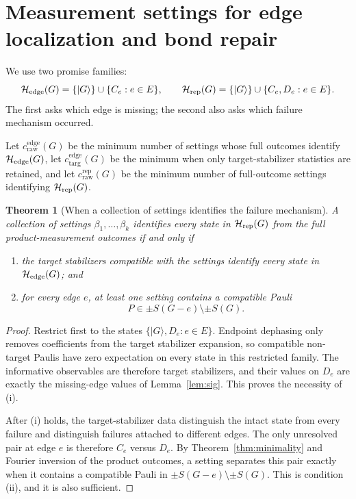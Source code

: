 \documentclass[11pt]{article}
\newtheorem{theorem}{Theorem}[section]
\theoremstyle{remark}
\newcommand{\cdiag}{c_{\mathrm{targ}}^{\mathrm{edge}}}
\newcommand{\ccutraw}{c_{\mathrm{raw}}^{\mathrm{edge}}}
\newcommand{\crep}{c_{\mathrm{raw}}^{\mathrm{rep}}}
\begin{document}
\section{Measurement settings for edge localization and bond repair}\label{sec:resources}

We use two promise families:
\[
\mathcal H_{\rm edge}(G)=\{|G\rangle\}\cup\{C_e:e\in E\},
\qquad
\mathcal H_{\rm rep}(G)=\{|G\rangle\}\cup\{C_e,D_e:e\in E\}.
\]
The first asks which edge is missing; the second also asks which failure mechanism occurred.

Let \(\ccutraw(G)\) be the minimum number of settings whose full outcomes identify \(\mathcal H_{\rm edge}(G)\), let \(\cdiag(G)\) be the minimum when only target-stabilizer statistics are retained, and let \(\crep(G)\) be the minimum number of full-outcome settings identifying \(\mathcal H_{\rm rep}(G)\).

\begin{theorem}[When a collection of settings identifies the failure mechanism]\label{thm:repdecomp}
A collection of settings \(\beta_1,\ldots,\beta_k\) identifies every state in \(\mathcal H_{\rm rep}(G)\) from the full product-measurement outcomes if and only if
\begin{enumerate}[label=(\roman*)]
\item the target stabilizers compatible with the settings identify every state in \(\mathcal H_{\rm edge}(G)\); and
\item for every edge \(e\), at least one setting contains a compatible Pauli
\[
P\in \pm S(G-e)\setminus\pm S(G).
\]
\end{enumerate}
\end{theorem}

\begin{proof}
Restrict first to the states \(\{|G\rangle,D_e:e\in E\}\).  Endpoint dephasing only removes coefficients from the target stabilizer expansion, so compatible non-target Paulis have zero expectation on every state in this restricted family.  The informative observables are therefore target stabilizers, and their values on \(D_e\) are exactly the missing-edge values of Lemma~\ref{lem:sig}.  This proves the necessity of (i).

After (i) holds, the target-stabilizer data distinguish the intact state from every failure and distinguish failures attached to different edges.  The only unresolved pair at edge \(e\) is therefore \(C_e\) versus \(D_e\).  By Theorem~\ref{thm:minimality} and Fourier inversion of the product outcomes, a setting separates this pair exactly when it contains a compatible Pauli in \(\pm S(G-e)\setminus\pm S(G)\).  This is condition (ii), and it is also sufficient.
\end{proof}
\end{document}

